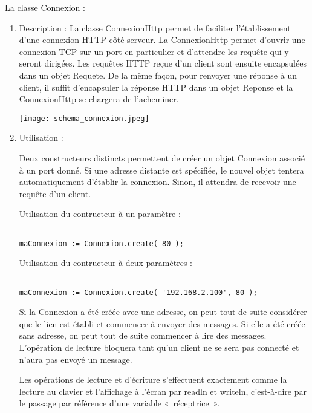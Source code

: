 \documentclass[12pt,pdftex,oneside]{uqam_these}
\begin{document}
La classe Connexion :

\begin{enumerate}

\item Description :  La classe ConnexionHttp permet de faciliter l'établissement
d'une connexion HTTP côté serveur. La ConnexionHttp permet d'ouvrir une
connexion TCP sur un port en particulier et d'attendre les requête qui y seront dirigées.
Les requêtes HTTP reçue d'un client sont ensuite encapsulées dans un objet
Requete. De la même façon, pour renvoyer une réponse à un client, il suffit
d'encapsuler la réponse HTTP dans un objet Reponse et la ConnexionHttp se
chargera de l'acheminer.

\texttt{[image: schema\_connexion.jpeg]}

\item Utilisation : 

Deux constructeurs distincts permettent de créer un objet Connexion
associé à un port donné. Si une adresse distante est spécifiée, le
nouvel objet tentera automatiquement d'établir la connexion. Sinon, il
attendra de recevoir une requête d'un client.

Utilisation du contructeur à un paramètre : 
\begin{verbatim}

maConnexion := Connexion.create( 80 );

\end{verbatim}

Utilisation du contructeur à deux paramètres : 

\begin{verbatim}

maConnexion := Connexion.create( '192.168.2.100', 80 );

\end{verbatim}

Si la Connexion a été créée avec une adresse, on peut tout de suite
considérer que le lien est établi et commencer à envoyer des
messages. Si elle a été créée sans adresse, on peut tout de suite
commencer à lire des messages. L'opération de lecture bloquera tant
qu'un client ne se sera pas connecté et n'aura pas envoyé un message.

Les opérations de lecture et d'écriture s'effectuent exactement comme
la lecture au clavier et l'affichage à l'écran par readln et writeln,
c'est-à-dire par le passage par référence d'une variable «~réceptrice~».

\begin{verbatim}


\end{verbatim}
\end{enumerate}
\end{document}
